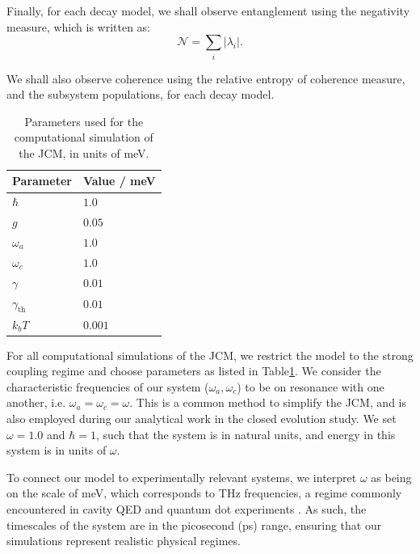 \documentclass[11pt]{article}
\begin{document}
\noindent Finally, for each decay model, we shall observe entanglement using the negativity measure, which is written as:
\begin{equation*} 
    \mathcal{N} = \sum_i |\lambda_i|.
\end{equation*}

We shall also observe coherence using the relative entropy of coherence measure, and the subsystem populations, for each decay model.\\

\begin{table}[h]
    \centering
    \caption{Parameters used for the computational simulation of the JCM, in units of meV.}
    \begin{tabular}{l|l}
        \toprule
        \textbf{Parameter} & \textbf{Value / meV} \\
        \midrule
        $\hbar$ & $1.0$ \\
        $g$ & $0.05$ \\
        $\omega_a$ & $1.0$ \\
        $\omega_c$ & $1.0$ \\
        $\gamma$ & $0.01$ \\
        $\gamma_{\scriptscriptstyle \text{th}}$ & $0.01$ \\
        $k_bT$ & $0.001$ \\
        \bottomrule
    \end{tabular}
    \label{tab:JCM_parameters}
\end{table}

\noindent For all computational simulations of the JCM, we restrict the model to the strong coupling regime and choose parameters as listed in Table\ref{tab:JCM_parameters}. We consider the characteristic frequencies of our system ($\omega_a, \omega_c$) to be on resonance with one another, i.e. $\omega_a = \omega_c = \omega$. This is a common method to simplify the JCM, and is also employed during our analytical work in the closed evolution study. We set $\omega = 1.0$ and $\hbar = 1$, such that the system is in natural units, and energy in this system is in units of $\omega$. 

\noindent To connect our model to experimentally relevant systems, we interpret $\omega$ as being on the scale of meV, which corresponds to THz frequencies, a regime commonly encountered in cavity QED and quantum dot experiments \cite{General2024-JCM_relevance}. As such, the timescales of the system are in the picosecond (ps) range, ensuring that our simulations represent realistic physical regimes.
\end{document}
